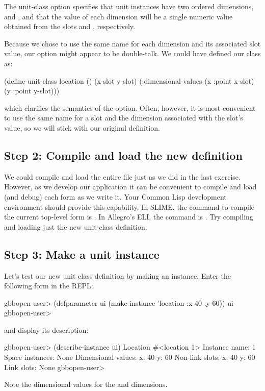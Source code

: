 \documentclass[10pt,twoside,english,pdftex]{article}
\begin{document}
The  unit-class option specifies that
 unit instances have two ordered dimensions, 
and , and that the value of each dimension will be a single numeric
value obtained from the slots  and , respectively.

Because we chose to use the same name for each dimension and its associated
slot value, our  option might appear to be
double-talk.  We could have defined our class as:
%
\W\supp
\begin{example}
\textcolor{darkergray}{%
  (define-unit-class location ()
    (x-slot y-slot)
    (:dimensional-values
      (x :point x-slot)
      (y :point y-slot)))}
\end{example}
%
which clarifies the semantics of the 
option.  Often, however, it is most convenient to use the same name
for a slot and the dimension associated with the slot's value, so we
will stick with our original definition.

\subsection*{Step 2: Compile and load the new definition}

We could compile and load the entire  file
just as we did in the last exercise.  However, as we develop our application
it can be convenient to compile and load (and debug) each form as we write it.
Your Common Lisp development environment should provide this capability.  In
SLIME, the command to compile the current top-level form is .  In Allegro's ELI, the command is .  Try
compiling and loading just the new  unit-class
definition.

\subsection*{Step 3: Make  a  unit instance}

%
%
Let's test our new  unit class definition by making an
instance.  Enter the following form in the REPL:
%
\W\supp
\begin{example}
\textcolor{darkergray}{%
  gbbopen-user> \textcolor{black}{(defparameter ui (make-instance 'location :x 40 :y 60))}
  ui
  gbbopen-user>}
\end{example}
%
%
and display its description:
%
\W\supp\notpretop
\begin{example}
\textcolor{darkergray}{%
  gbbopen-user> \textcolor{black}{(describe-instance ui)}
  Location #<location 1>
    Instance name: 1
    Space instances: None
    Dimensional values:
      x:  40
      y:  60
    Non-link slots:
      x:  40
      y:  60
    Link slots: None
  gbbopen-user>}
\end{example}
%
Note the dimensional values for the  and  dimensions.
\end{document}
